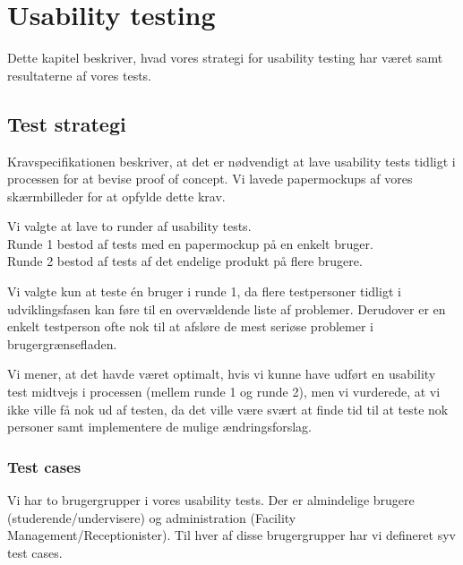 \chapter{Usability testing}
\label{Usability}
Dette kapitel beskriver, hvad vores strategi for usability testing har været samt resultaterne af vores tests.

\section{Test strategi}
\label{Usability_TS}
Kravspecifikationen beskriver, at det er nødvendigt at lave usability tests tidligt i processen for at bevise proof of concept. Vi lavede papermockups af vores skærmbilleder for at opfylde dette krav. 

Vi valgte at lave to runder af usability tests.
\\Runde 1 bestod af tests med en papermockup på en enkelt bruger.
\\Runde 2 bestod af tests af det endelige produkt på flere brugere.

Vi valgte kun at teste én bruger i runde 1, da flere testpersoner tidligt i udviklingsfasen kan føre til en overvældende liste af problemer\cite[s. 416]{SL_UID}. Derudover er en enkelt testperson ofte nok til at afsløre de mest seriøse problemer i brugergrænsefladen.

Vi mener, at det havde været optimalt, hvis vi kunne have udført en usability test midtvejs i processen (mellem runde 1 og runde 2), men vi vurderede, at vi ikke ville få nok ud af testen, da det ville være svært at finde tid til at teste nok personer samt implementere de mulige ændringsforslag.

\subsection{Test cases}
\label{Usability_TS_TC}
Vi har to brugergrupper i vores usability tests. Der er almindelige brugere (studerende/undervisere) og administration (Facility Management/Receptionister). Til hver af disse brugergrupper har vi defineret syv test cases.

